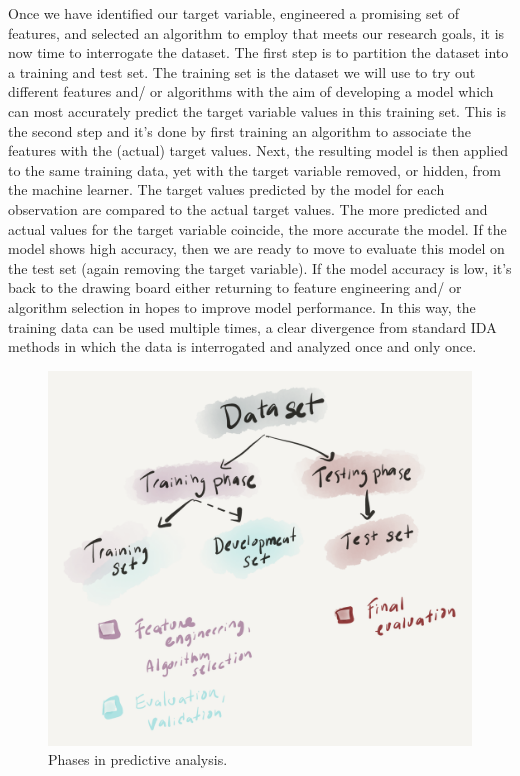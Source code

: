 \documentclass[
  letterpaper,
]{scrbook}
\begin{document}
Once we have identified our target variable, engineered a promising set
of features, and selected an algorithm to employ that meets our research
goals, it is now time to interrogate the dataset. The first step is to
partition the dataset into a training and test set. The training set is
the dataset we will use to try out different features and/ or algorithms
with the aim of developing a model which can most accurately predict the
target variable values in this training set. This is the second step and
it's done by first training an algorithm to associate the features with
the (actual) target values. Next, the resulting model is then applied to
the same training data, yet with the target variable removed, or hidden,
from the machine learner. The target values predicted by the model for
each observation are compared to the actual target values. The more
predicted and actual values for the target variable coincide, the more
accurate the model. If the model shows high accuracy, then we are ready
to move to evaluate this model on the test set (again removing the
target variable). If the model accuracy is low, it's back to the drawing
board either returning to feature engineering and/ or algorithm
selection in hopes to improve model performance. In this way, the
training data can be used multiple times, a clear divergence from
standard IDA methods in which the data is interrogated and analyzed once
and only once.

\begin{figure}[h]

{\centering \includegraphics[width=4.8in,height=\textheight]{./figures/approaching-analysis/predictive-phases.png}

}

\caption{\label{fig-aa-predictive-phases}Phases in predictive analysis.}

\end{figure}
\end{document}
